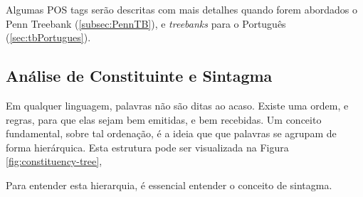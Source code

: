 Algumas POS tags serão descritas com mais detalhes quando forem abordados o Penn Treebank (\ref{subsec:PennTB}), e \textit{treebanks} para o Português (\ref{sec:tbPortugues}).


\subsection{Análise de Constituinte e Sintagma}
\label{subsec:analiseConstSintagma}

Em qualquer linguagem, palavras não são ditas ao acaso. Existe uma ordem, e regras, para que elas sejam bem emitidas, e bem recebidas. Um conceito fundamental, sobre tal ordenação, é a ideia que que palavras se agrupam de forma hierárquica. 
Esta estrutura pode ser visualizada na Figura \ref{fig:constituency-tree},
\begin{center}

\end{center}
Para entender esta hierarquia, é essencial entender o conceito de sintagma. 

